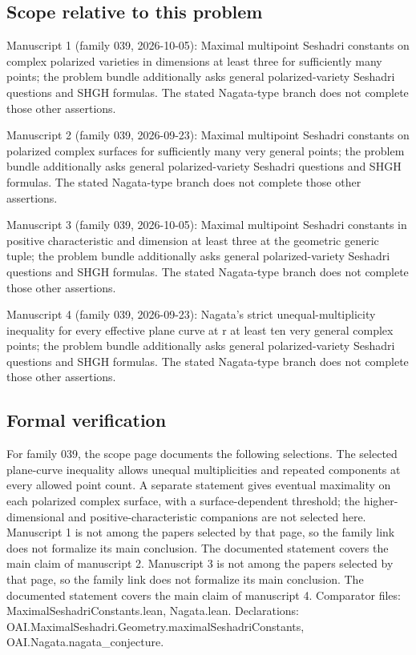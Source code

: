 \documentclass[11pt]{article}
\begin{document}
\subsection{Scope relative to this problem}
Manuscript 1 (family 039, 2026-10-05): Maximal multipoint Seshadri constants on complex polarized varieties in dimensions at least three for sufficiently many points; the problem bundle additionally asks general polarized-variety Seshadri questions and SHGH formulas. The stated Nagata-type branch does not complete those other assertions.

Manuscript 2 (family 039, 2026-09-23): Maximal multipoint Seshadri constants on polarized complex surfaces for sufficiently many very general points; the problem bundle additionally asks general polarized-variety Seshadri questions and SHGH formulas. The stated Nagata-type branch does not complete those other assertions.

Manuscript 3 (family 039, 2026-10-05): Maximal multipoint Seshadri constants in positive characteristic and dimension at least three at the geometric generic tuple; the problem bundle additionally asks general polarized-variety Seshadri questions and SHGH formulas. The stated Nagata-type branch does not complete those other assertions.

Manuscript 4 (family 039, 2026-09-23): Nagata’s strict unequal-multiplicity inequality for every effective plane curve at r at least ten very general complex points; the problem bundle additionally asks general polarized-variety Seshadri questions and SHGH formulas. The stated Nagata-type branch does not complete those other assertions.

\subsection{Formal verification}
For family 039, the scope page documents the following selections. The selected plane-curve inequality allows unequal multiplicities and repeated components at every allowed point count. A separate statement gives eventual maximality on each polarized complex surface, with a surface-dependent threshold; the higher-dimensional and positive-characteristic companions are not selected here. Manuscript 1 is not among the papers selected by that page, so the family link does not formalize its main conclusion. The documented statement covers the main claim of manuscript 2. Manuscript 3 is not among the papers selected by that page, so the family link does not formalize its main conclusion. The documented statement covers the main claim of manuscript 4. Comparator files: MaximalSeshadriConstants.lean, Nagata.lean. Declarations: OAI.MaximalSeshadri.Geometry.maximalSeshadriConstants, OAI.Nagata.nagata\_conjecture.
\end{document}

